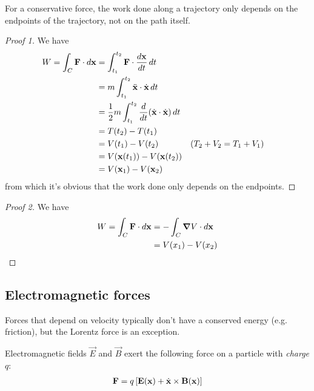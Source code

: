 \documentclass{../template/note}
\begin{document}
    \begin{proposition}
        For a conservative force, the work done along a trajectory only depends on the endpoints of the trajectory, not on the path itself.
    \end{proposition}
    
    \begin{proof}[Proof 1]
        We have
        \begin{align*}
            W = \int_C \vec F \cdot d \vec x &= \int_{t_1}^{t_2} \vec F \cdot \frac{d \vec x}{dt} \D t \\
            &= m \int_{t_1}^{t_2} \ddot{\vec x} \cdot \dot{\vec x} \D t \\
            &= \frac{1}{2}m \int_{t_1}^{t_2} \frac{d}{dt}(\dot{\vec x} \cdot \dot{\vec x}) \D t \\
            &= T(t_2) - T(t_1) \\
            &= V(t_1) - V(t_2) && (T_2 + V_2 = T_1 + V_1) \\
            &= V(\vec x(t_1)) - V(\vec x(t_2)) \\
            &= V(\vec x_1) - V(\vec x_2)
        \end{align*}
        from which it's obvious that the work done only depends on the endpoints.
    \end{proof}
    
    \begin{proof}[Proof 2]
        We have
        \begin{align*}
            W = \int_C \vec F \cdot d \vec x &= -\int_C \grad V \cdot d \vec x \\
            &= V(x_1) - V(x_2)
        \end{align*}
    \end{proof}
    
    \subsection{Electromagnetic forces}

    Forces that depend on velocity typically don't have a conserved energy (e.g. friction), but the Lorentz force is an exception.

    Electromagnetic fields \(\vec E\) and \(\vec B\) exert the following force on a particle with \emph{charge} \(q\):
    \begin{align*}
        \V F = q\left[\V E(\V x) + \dot{\V x} \times \V B(\V x)\right]
    \end{align*}
    
\end{document}
